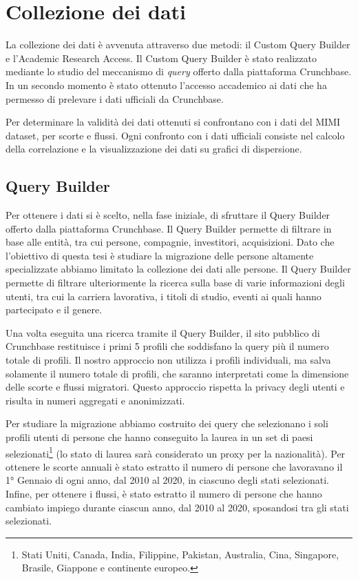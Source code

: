 \section{Collezione dei dati}
\label{sezionecollezionedati}
La collezione dei dati è avvenuta attraverso due metodi: il Custom Query Builder e l'Academic Research Access. Il Custom Query Builder è stato realizzato mediante lo studio del meccanismo di \textit{query} offerto dalla piattaforma Crunchbase. In un secondo momento è stato ottenuto l'accesso accademico ai dati che ha permesso di prelevare i dati ufficiali da Crunchbase.

Per determinare la validità dei dati ottenuti si confrontano con i dati del MIMI dataset, per scorte e flussi. Ogni confronto con i dati ufficiali consiste nel calcolo della correlazione e la visualizzazione dei dati su grafici di dispersione. 

\subsection{Query Builder}
\label{sottosezionequerybuilder}
Per ottenere i dati si è scelto, nella fase iniziale, di sfruttare il Query Builder offerto dalla piattaforma Crunchbase.
Il Query Builder permette di filtrare in base alle entità, tra cui persone, compagnie, investitori, acquisizioni.
Dato che l'obiettivo di questa tesi è studiare la migrazione delle persone altamente specializzate abbiamo limitato la collezione dei dati alle persone.
Il Query Builder permette di filtrare ulteriormente la ricerca sulla base di varie informazioni degli utenti, tra cui la carriera lavorativa, i titoli di studio, eventi ai quali hanno partecipato e il genere.

Una volta eseguita una ricerca tramite il Query Builder, il sito pubblico di Crunchbase  restituisce i primi 5 profili che soddisfano la query più il numero totale di profili. Il nostro approccio non utilizza i profili individuali, ma salva solamente il numero totale di profili, che saranno interpretati come la dimensione delle scorte e flussi migratori. Questo approccio rispetta la privacy degli utenti e risulta in numeri aggregati e anonimizzati. 


Per studiare la migrazione abbiamo costruito dei query che selezionano i soli profili utenti di persone che hanno conseguito la laurea in un set di paesi selezionati\footnote{Stati Uniti, Canada, India, Filippine, Pakistan, Australia, Cina, Singapore, Brasile, Giappone e continente europeo.} (lo stato di laurea sarà considerato un proxy per la nazionalità). Per ottenere le scorte annuali è stato estratto il numero di persone che lavoravano il 1° Gennaio di ogni anno, dal 2010 al 2020, in ciascuno degli stati selezionati. 
Infine, per ottenere i flussi, è stato estratto il numero di persone che hanno cambiato impiego durante ciascun anno, dal 2010 al 2020, sposandosi tra gli stati selezionati. 


